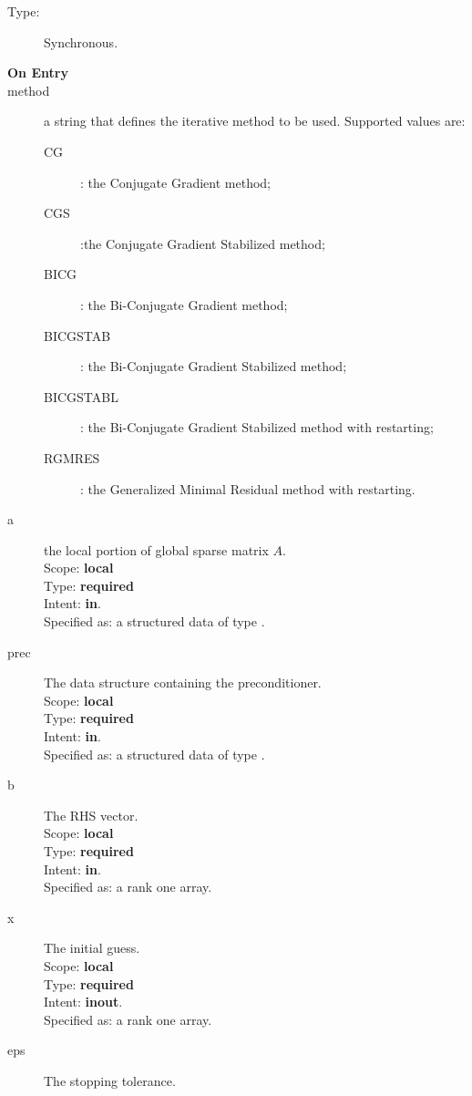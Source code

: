 \begin{description}
\item[Type:] Synchronous.
\item[\bf On Entry]
\item[method] a string that defines the iterative method to be
  used. Supported values are:
  \begin{description}
  \item[CG]: the Conjugate Gradient method;
  \item[CGS]:the Conjugate Gradient Stabilized method;

  \item[BICG]: the Bi-Conjugate Gradient method;
  \item[BICGSTAB]: the Bi-Conjugate Gradient Stabilized method;
  \item[BICGSTABL]: the Bi-Conjugate Gradient Stabilized method with restarting;
  \item[RGMRES]: the Generalized Minimal Residual method with restarting.
  \end{description}
\item[a] the local portion of global sparse matrix
$A$. \\
Scope: {\bf local} \\
Type: {\bf required}\\
Intent: {\bf in}.\\
Specified as: a structured data of type \spdata.
\item[prec] The data structure containing the preconditioner.\\
Scope: {\bf local} \\
Type: {\bf required}\\
Intent: {\bf in}.\\
Specified as: a structured data of type \precdata.
\item[b] The RHS vector. \\
Scope: {\bf local} \\
Type: {\bf required}\\
Intent: {\bf in}.\\
Specified as: a rank one array.
\item[x] The initial guess. \\
Scope: {\bf local} \\
Type: {\bf required}\\
Intent: {\bf inout}.\\
Specified as: a rank one array.
\item[eps] The stopping tolerance. \\

\end{description}
